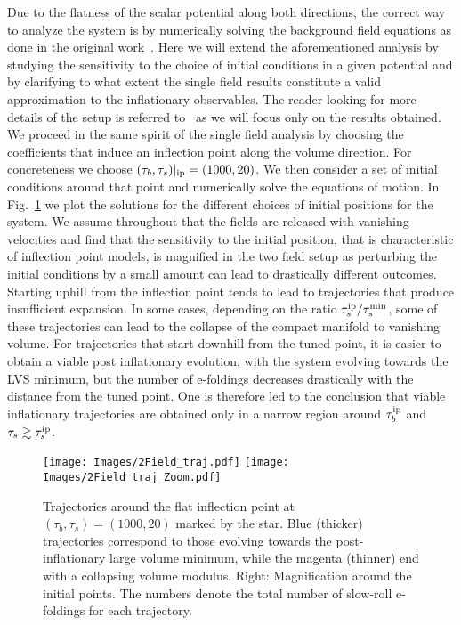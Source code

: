 \documentclass[12pt,a4paper]{book}
\begin{document}
Due to the flatness of the scalar potential along both directions, the correct way to analyze the system is by numerically solving the background field equations as done in the original work~\cite{Conlon:2008cj}. Here we will extend the aforementioned analysis by studying the sensitivity to the choice of initial conditions in a given potential and by clarifying to what extent the single field results constitute a valid approximation to the inflationary observables. The reader looking for more details of the setup is referred to~\cite{Conlon:2008cj} as we will focus only on the results obtained.\\

We proceed in the same spirit of the single field analysis by choosing the coefficients that induce an inflection point along the volume direction. For concreteness we choose $(\tau_b,\tau_s)|_{\rm ip}=(1000,20)$. We then consider a set of initial conditions around that point and numerically solve the equations of motion. In Fig.~\ref{fig:2FieldLVS} we plot the solutions for the different choices of initial positions for the system. We assume throughout that the fields are released with vanishing velocities and find that the sensitivity to the initial position, that is characteristic of inflection point models, is magnified in the two field setup as perturbing the initial conditions by a small amount can lead to drastically different outcomes. Starting uphill from the inflection point tends to lead to trajectories that produce insufficient expansion. In some cases, depending on the ratio $\tau_s^{\rm ip}/\tau_s^{\rm min}$, some of these trajectories can lead to the collapse of the compact manifold to vanishing volume. For trajectories that start downhill from the tuned point, it is easier to obtain a viable post inflationary evolution, with the system evolving towards the LVS minimum, but the number of e-foldings decreases drastically with the distance from the tuned point. One is therefore led to the conclusion that viable inflationary trajectories are obtained only in a narrow region around $\tau_b^{\rm ip}$ and $\tau_s\gtrsim \tau_s^{\rm ip}$.\\

\begin{figure}[ht!]
\centering
{\texttt{[image: Images/2Field\_traj.pdf]}} \quad
{\texttt{[image: Images/2Field\_traj\_Zoom.pdf]}} 
\caption{Trajectories around the flat inflection point at $(\tau_b,\tau_s)= (1000 , 20)$ marked by the star. Blue (thicker) trajectories correspond to those evolving towards the post-inflationary large volume minimum, while the magenta (thinner) end with a collapsing volume modulus. Right: Magnification around the initial points. The numbers denote the total number of slow-roll e-foldings for each trajectory.}
\label{fig:2FieldLVS}
\end{figure}
\end{document}

